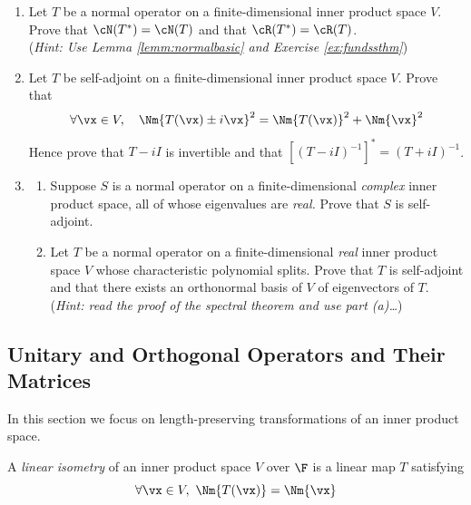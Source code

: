 \begin{exercises}
\begin{enumerate}[label=\thesubsection.\arabic*., align=right]
  
  \item Let $T$ be a normal operator on a finite-dimensional inner product space $V$. Prove that $\cN(T^*)=\cN(T)$ and that $\cR(T^*)=\cR(T)$.\\
  (\emph{Hint: Use Lemma \ref{lemm:normalbasic} and Exercise \ref{ex:fundssthm}})
  
  \item Let $T$ be self-adjoint on a finite-dimensional inner product space $V$. Prove that
  \[\forall\vx\in V,\quad \Nm{T(\vx)\pm i\vx}^2=\Nm{T(\vx)}^2+\Nm{\vx}^2\]
  Hence prove that $T-iI$ is invertible and that $[(T-iI)^{-1}]^*=(T+iI)^{-1}$.
  
  \item\begin{enumerate}
    \item Suppose $S$ is a normal operator on a finite-dimensional \emph{complex} inner product space, all of whose eigenvalues are \emph{real.} Prove that $S$ is self-adjoint.
    \item Let $T$ be a normal operator on a finite-dimensional \emph{real} inner product space $V$ whose characteristic polynomial splits. Prove that $T$ is self-adjoint and that there exists an orthonormal basis of $V$ of eigenvectors of $T$.\\
    (\emph{Hint: read the proof of the spectral theorem and use part (a)\ldots})
  \end{enumerate}
\end{enumerate}
\end{exercises}



\subsection{Unitary and Orthogonal Operators and Their Matrices}

In this section we focus on length-preserving transformations of an inner product space.

\begin{defn}{}{}
A \emph{linear isometry} of an inner product space $V$ over $\F$ is a linear map $T$ satisfying
\[\forall \vx\in V,\ \Nm{T(\vx)}=\Nm{\vx}\]
\end{defn}

